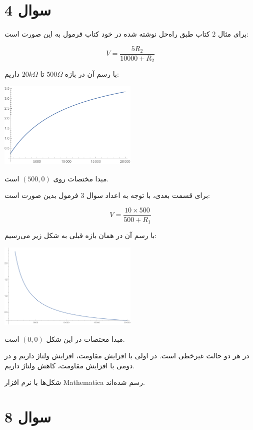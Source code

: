 \documentclass[12pt]{article}
\begin{document}
\KashidaOff


\section*{سوال 4}

برای مثال $2$ کتاب طبق راه‌حل نوشته شده در خود کتاب فرمول به این صورت است:

$$V = \frac{5R_2}{10000 + R_2}$$

با رسم آن در بازه $500\Omega$ تا $20k\Omega$ داریم:

\begin{center}
\includegraphics[width = 0.5\textwidth]{images/1.pdf}
\end{center}
مبدا مختصات روی
$(500 , 0)$
است.

برای قسمت بعدی، با توجه به اعداد سوال $3$ فرمول بدین صورت است:

$$V = \frac{10\times 500}{500 + R_1}$$

با رسم آن در همان بازه قبلی به شکل زیر می‌رسیم:

\begin{center}
	\includegraphics[width = 0.5\textwidth]{images/2.pdf}
\end{center}

مبدا مختصات در این شکل $(0,0)$ است.

در هر دو حالت غیرخطی است. در اولی با افزایش مقاومت، افزایش ولتاژ داریم و در دومی با افزایش مقاومت، کاهش ولتاژ داریم.

شکل‌ها با نرم افزار Mathematica رسم شده‌اند.

\newpage

\section*{سوال 8}
\end{document}
